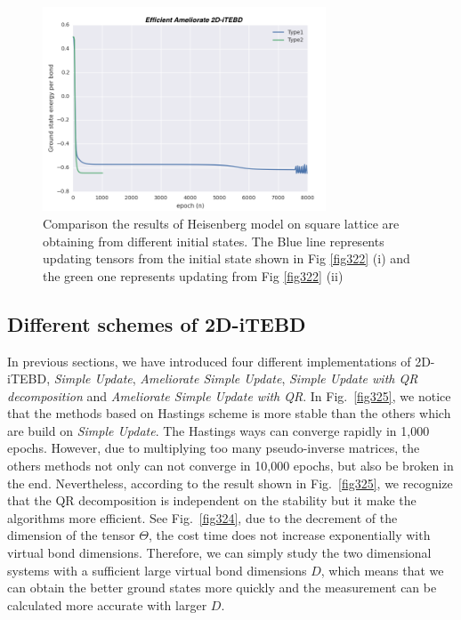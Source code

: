 \begin{figure}[ht]
	\centering
	\includegraphics[width=0.75\textwidth]{figures/fig323.png}
	\caption[Comparison the results of Heisenberg model on square lattice which are obtaining from different initial states.]{Comparison the results of Heisenberg model on square lattice are obtaining from different initial states. The Blue line represents updating tensors from the initial state shown in Fig \ref{fig322} (i) and the green one represents updating from Fig \ref{fig322} (ii)}

	\label{fig323}
\end{figure}

\subsection{Different schemes of 2D-iTEBD}

In previous sections, we have introduced four different implementations of 2D-iTEBD, \textit{Simple Update}, \textit{Ameliorate Simple Update}, \textit{Simple Update with QR decomposition} and \textit{Ameliorate Simple Update with QR}. In Fig.~\ref{fig325}, we notice that the methods based on Hastings scheme is more stable than the others which are build on \textit{Simple Update}. The Hastings ways can converge rapidly in 1,000 epochs. However, due to multiplying too many pseudo-inverse matrices, the others methods not only can not converge in 10,000 epochs, but also be broken in the end. Nevertheless, according to the result shown in Fig.~\ref{fig325}, we recognize that the QR decomposition is independent on the stability but it make the algorithms more efficient. See Fig.~\ref{fig324}, due to the decrement of the dimension of the tensor $\Theta$, the cost time does not increase exponentially with virtual bond dimensions. Therefore, we can simply study the two dimensional systems with a sufficient large virtual bond dimensions $D$, which means that we can obtain the better ground states more quickly and the measurement can be calculated more accurate with larger $D$.

